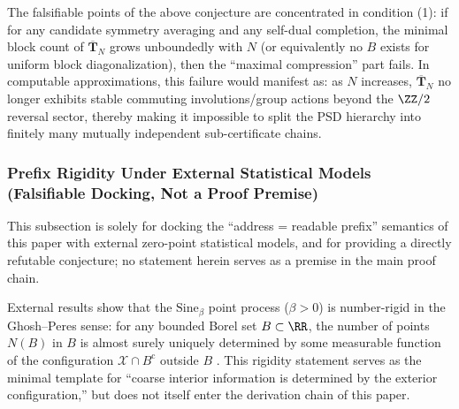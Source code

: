 \begin{remark}\label{rem:discussion-phi-slice-falsifiability}
The falsifiable points of the above conjecture are concentrated in condition (1): if for any candidate symmetry averaging and any self-dual completion, the minimal block count of \(\overline{\mathbf{T}}_N\) grows unboundedly with \(N\) (or equivalently no \(B\) exists for uniform block diagonalization), then the ``maximal compression'' part fails.
In computable approximations, this failure would manifest as: as \(N\) increases, \(\overline{\mathbf{T}}_N\) no longer exhibits stable commuting involutions/group actions beyond the \(\ZZ/2\) reversal sector, thereby making it impossible to split the PSD hierarchy into finitely many mutually independent sub-certificate chains.
\end{remark}

\subsubsection{Prefix Rigidity Under External Statistical Models (Falsifiable Docking, Not a Proof Premise)}\label{subsubsec:discussion-prefix-rigidity}
This subsection is solely for docking the ``address = readable prefix'' semantics of this paper with external zero-point statistical models, and for providing a directly refutable conjecture; no statement herein serves as a premise in the main proof chain.

\begin{remark}\label{rem:discussion-sinebeta-number-rigidity}
External results show that the \(\mathrm{Sine}_{\beta}\) point process (\(\beta>0\)) is number-rigid in the Ghosh--Peres sense: for any bounded Borel set \(B\subset\RR\), the number of points \(N(B)\) in \(B\) is almost surely uniquely determined by some measurable function of the configuration \(\mathcal X\cap B^{\mathrm c}\) outside \(B\) \cite{ChhaibiNajnudel2018RigiditySineBeta}.
This rigidity statement serves as the minimal template for ``coarse interior information is determined by the exterior configuration,'' but does not itself enter the derivation chain of this paper.
\end{remark}

